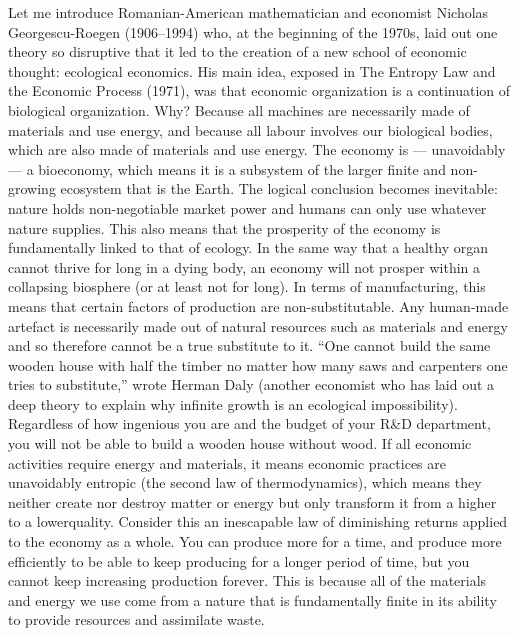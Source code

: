 \documentclass[
]{book}
\begin{document}
Let me introduce
Romanian-American mathematician and economist Nicholas Georgescu-Roegen
(1906--1994) who, at the beginning of the 1970s, laid out one theory so disruptive that
it led to the creation of a new school of economic thought: ecological economics. His
main idea, exposed in The Entropy Law and the Economic Process (1971), was that
economic organization is a continuation of biological organization. Why? Because all
machines are necessarily made of materials and use energy, and because all labour
involves our biological bodies, which are also made of materials and use energy. The
economy is --- unavoidably --- a bioeconomy, which means it is a subsystem of the larger
finite and non-growing ecosystem that is the Earth.
The logical conclusion becomes inevitable: nature holds non-negotiable market power
and humans can only use whatever nature supplies. This also means that the prosperity
of the economy is fundamentally linked to that of ecology. In the same way that a
healthy organ cannot thrive for long in a dying body, an economy will not prosper
within a collapsing biosphere (or at least not for long). In terms of manufacturing, this
means that certain factors of production are non-substitutable. Any human-made
artefact is necessarily made out of natural resources such as materials and energy and
so therefore cannot be a true substitute to it. ``One cannot build the same wooden house
with half the timber no matter how many saws and carpenters one tries to substitute,''
wrote Herman Daly (another economist who has laid out a deep theory to explain why
infinite growth is an ecological impossibility). Regardless of how ingenious you are and
the budget of your R\&D department, you will not be able to build a wooden house
without wood.
If all economic activities require energy and materials, it means economic practices are
unavoidably entropic (the second law of thermodynamics), which means they neither
create nor destroy matter or energy but only transform it from a higher to a lowerquality. Consider this an inescapable law of diminishing returns applied to the economy
as a whole. You can produce more for a time, and produce more efficiently to be able to
keep producing for a longer period of time, but you cannot keep increasing production
forever. This is because all of the materials and energy we use come from a nature that
is fundamentally finite in its ability to provide resources and assimilate waste.
\end{document}
